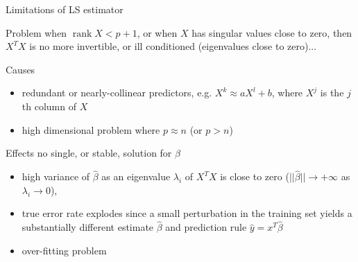 \documentclass[compress, smaller, serif, 9pt]{beamer}
\newcommand{\doigtr}{\alert{\noindent \Pisymbol{pzd}{43}}}
\DeclareMathOperator{\rank}{rank}
\begin{document}
\begin{frame}{Limitations of LS estimator}

\begin{block}{Problem}  
 when $\rank {X} < p+1$, or when $X$ has singular values close to zero, then $ X^T X $ is no more invertible, or 
ill conditioned (eigenvalues close to zero)... 
\end{block}


\begin{block}{Causes} 
\begin{itemize}
 \item redundant or nearly-collinear predictors, e.g. $X^k \approx a X^l + b$, where $X^j$ is the $j$th column of $X$
 \item \alert{high dimensional} problem where \alert{$p \approx n$} (or $p>n$)
\end{itemize}
\end{block}

\begin{block}{Effects} 
no single, or stable, solution for $\widehat{\beta}$
\begin{itemize}
 \item high variance of $\widehat{\beta}$ as an eigenvalue $\lambda_i$ of $X^TX$ is close to zero 
 ($||\widehat{\beta}|| \rightarrow +\infty$ as $\lambda_i \rightarrow 0$),
 \item true error rate  explodes since a small perturbation in the training set  yields a substantially different 
 estimate $\widehat{\beta}$ and prediction rule $\widehat{y}= x^T \widehat{\beta}$ 
 \item[\doigtr] \alert{over-fitting problem} 
\end{itemize}
\end{block}

\end{frame}
\end{document}
